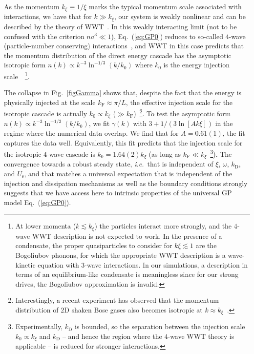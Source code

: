 \documentclass[prl,aps,twocolumn, a4paper,longbibliography,superscriptaddress]{revtex4-2}
\newcommand{\kD}{k_{\textrm{D}}}
\newcommand{\kF}{k_{\textrm{F}}}
\newcommand{\Us}{U_{\textrm{s}}}
\begin{document}
As the momentum $k_\xi\equiv1/\xi$ marks the typical momentum scale associated with interactions,
we have that for $k\gg k_\xi$, our system is weakly nonlinear and can be described by the theory of WWT~\cite{Zakharov:1992,Nazarenko:2011}. In this weakly interacting limit (not to be confused with the criterion $na^3\ll 1$), Eq.~(\ref{eq:GP0}) reduces to so-called $4$-wave (particle-number conserving) interactions~\cite{Nazarenko:2011}, and WWT in this case predicts that the momentum distribution of the direct energy cascade has the asymptotic isotropic form $n(k)\propto k^{-3}\ln^{-1/3}(k/k_0)$ where $k_0$ is the energy injection scale~\cite{Zhu:2023a}~\footnote{At lower momenta ($k\lesssim k_\xi$) the particles interact more strongly, and the $4$-wave WWT description is not expected to work. In the presence of a condensate, the proper quasiparticles to consider for $k\xi\lesssim1$ are the Bogoliubov phonons, for which the appropriate WWT description is a wave-kinetic equation with 3-wave interactions. In our simulations, a description in terms of an equilibrium-like condensate is meaningless since for our strong drives, the Bogoliubov approximation is invalid.}.


The collapse in Fig.~\ref{figGamma} shows that, despite the fact that the energy is physically injected at the scale $\kF\approx\pi/L$, the effective injection scale for the isotropic cascade is actually $k_0\propto k_\xi$ ($\gg \kF$)~\footnote{Interestingly, a recent experiment has observed that the momentum distribution of $2$D shaken Bose gases also becomes isotropic at $k\approx k_\xi$~\cite{Galka:2022}.}.
To test the asymptotic form $n(k)\propto k^{-3}\ln^{-1/3}(k/k_0)$, we fit $\gamma(k)$ with $3+1/(3\ln[Ak\xi])$ in the regime where the numerical data overlap. We find that for $A=0.61(1)$, the fit captures the data well. Equivalently, this fit predicts that the injection scale for the isotropic $4$-wave cascade is $k_0=1.64(2)k_\xi$ (as long as $\kF\ll k_\xi$~\footnote{Experimentally, $\kD$ is bounded, so the separation between the injection scale $k_0\propto k_\xi$ and $\kD$ -- and hence the region where the $4$-wave WWT theory is applicable -- is reduced for stronger interactions.}). The convergence towards a robust steady state, \emph{i.e.}\ that is independent of $\xi$, $\omega$, $\kD$, and $\Us$, and that matches a universal expectation that is independent of the injection and dissipation mechanisms as well as the boundary conditions strongly suggests that we have access here to intrinsic properties of the universal GP model Eq.~(\ref{eq:GP0}).
\end{document}
